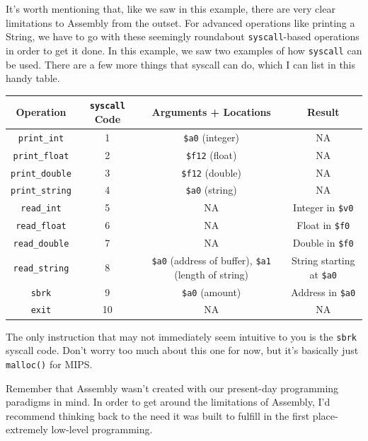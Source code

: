 \documentclass[english, 10pt]{article}
\begin{document}
It's worth mentioning that, like we saw in this example, there are very clear limitations to Assembly from the outset. For advanced operations like printing a String, we have to go with these seemingly roundabout \texttt{syscall}-based operations in order to get it done. In this example, we saw two examples of how \texttt{syscall} can be used. There are a few more things that syscall can do, which I can list in this handy table.\newline

{

\begin{center}
 \begin{tabular}{||c c c c||} 
 \hline
 Operation & \texttt{syscall} Code & Arguments + Locations & Result \\ [0.5ex] 
 \hline\hline
 \texttt{print\_int} & 1 & \texttt{\$a0} (integer) & NA \\ 
 \hline
 \texttt{print\_float} & 2 & \texttt{\$f12} (float) & NA \\
 \hline
 \texttt{print\_double} & 3 & \texttt{\$f12} (double) & NA \\
 \hline
 \texttt{print\_string} & 4 & \texttt{\$a0} (string) & NA \\
 \hline
 \texttt{read\_int} & 5 & NA & Integer in \texttt{\$v0} \\
 \hline
 \texttt{read\_float} & 6 & NA & Float in \texttt{\$f0} \\
 \hline
 \texttt{read\_double} & 7 & NA & Double in \texttt{\$f0} \\
 \hline
 \texttt{read\_string} & 8 & \texttt{\$a0} (address of buffer), \texttt{\$a1} (length of string) & String starting at \texttt{\$a0} \\
 \hline
 \texttt{sbrk} & 9 & \texttt{\$a0} (amount) & Address in \texttt{\$a0} \\
 \hline
 \texttt{exit} & 10 & NA & NA \\
 \hline  
 
\end{tabular}
\end{center}

}

The only instruction that may not immediately seem intuitive to you is the \texttt{sbrk} syscall code. Don't worry too much about this one for now, but it's basically just \texttt{malloc()} for MIPS.\newline

Remember that Assembly wasn't created with our present-day programming paradigms in mind. In order to get around the limitations of Assembly, I'd recommend thinking back to the need it was built to fulfill in the first place- extremely low-level programming.
\end{document}
